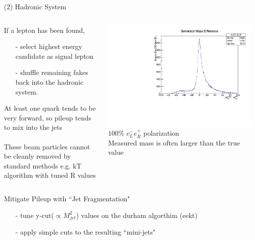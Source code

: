 \documentclass[10pt]{beamer}
\begin{document}
\begin{frame}{(2) Hadronic System}

\begin{columns}
\begin{column}{0.5\textwidth}
If a lepton has been found, 
\begin{itemize}
\scriptsize
\item[-]select highest energy candidate as signal lepton\\
\item[-] shuffle remaining fakes back into the hadronic system.\\
\end{itemize}
\scriptsize
At least one quark tends to be very forward, so pileup tends to mix into the jets\\
\quad \quad \\
These beam particles cannot be cleanly removed by standard methods e.g. kT algorithm with tuned R values\\

\end{column}
\begin{column}{0.5\textwidth}

\includegraphics[scale=0.3]{nocutDiff.pdf}\\
\scriptsize
\quad $100\% \, \, e^-_L e^+_R$ polarization\\
 Measured mass is often larger than the true value \\



\end{column}
\end{columns}
\normalsize
Mitigate Pileup with ``Jet Fragmentation"\\
  \begin{itemize}
  	\scriptsize
  \item[-]tune y-cut($\propto M^2_{jet}$) values on the durham algorthim (eekt)
  \item[-]apply simple cuts to the resulting ``mini-jets"\\
  \end{itemize}

\end{frame}
\end{document}
